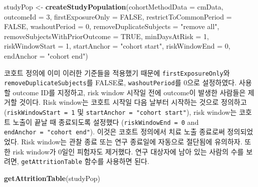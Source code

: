 \documentclass[11pt]{book}
\newenvironment{Shaded}{\begin{snugshade}}{\end{snugshade}}
\newcommand{\KeywordTok}[1]{\textcolor[rgb]{0.13,0.29,0.53}{\textbf{#1}}}
\newcommand{\DataTypeTok}[1]{\textcolor[rgb]{0.13,0.29,0.53}{#1}}
\newcommand{\DecValTok}[1]{\textcolor[rgb]{0.00,0.00,0.81}{#1}}
\newcommand{\StringTok}[1]{\textcolor[rgb]{0.31,0.60,0.02}{#1}}
\newcommand{\OtherTok}[1]{\textcolor[rgb]{0.56,0.35,0.01}{#1}}
\newcommand{\NormalTok}[1]{#1}
\theoremstyle{definition}
\theoremstyle{definition}
\theoremstyle{definition}
\theoremstyle{remark}
\begin{document}
\begin{Shaded}
\begin{Highlighting}[]
\NormalTok{studyPop <-}\StringTok{ }\KeywordTok{createStudyPopulation}\NormalTok{(}\DataTypeTok{cohortMethodData =}\NormalTok{ cmData,}
                                  \DataTypeTok{outcomeId =} \DecValTok{3}\NormalTok{,}
                                  \DataTypeTok{firstExposureOnly =} \OtherTok{FALSE}\NormalTok{,}
                                  \DataTypeTok{restrictToCommonPeriod =} \OtherTok{FALSE}\NormalTok{,}
                                  \DataTypeTok{washoutPeriod =} \DecValTok{0}\NormalTok{,}
                                  \DataTypeTok{removeDuplicateSubjects =} \StringTok{"remove all"}\NormalTok{,}
                                  \DataTypeTok{removeSubjectsWithPriorOutcome =} \OtherTok{TRUE}\NormalTok{,}
                                  \DataTypeTok{minDaysAtRisk =} \DecValTok{1}\NormalTok{,}
                                  \DataTypeTok{riskWindowStart =} \DecValTok{1}\NormalTok{,}
                                  \DataTypeTok{startAnchor =} \StringTok{"cohort start"}\NormalTok{,}
                                  \DataTypeTok{riskWindowEnd =} \DecValTok{0}\NormalTok{,}
                                  \DataTypeTok{endAnchor =} \StringTok{"cohort end"}\NormalTok{)}
\end{Highlighting}
\end{Shaded}

코호트 정의에 이미 이러한 기준들을 적용했기 때문에
\texttt{firstExposureOnly}와 \texttt{removeDuplicateSubjects}를 FALSE로,
\texttt{washoutPeriod}를 0으로 설정하였다. 사용할 outcome ID를 지정하고,
risk window 시작일 전에 outcome이 발생한 사람들은 제거할 것이다. Risk
window는 코호트 시작일 다음 날부터 시작하는 것으로 정의하고
(\texttt{riskWindowStart\ =\ 1} 및
\texttt{startAnchor\ =\ "cohort\ start"}), risk window는 코호트 노출이
끝날 때 종료되도록 설정했다 (\texttt{riskWindowEnd\ =\ 0} and
\texttt{endAnchor\ =\ "cohort\ end"}). 이것은 코호트 정의에서 치료 노출
종료로써 정의되었었다. Risk window는 관찰 종료 또는 연구 종료일에
자동으로 절단됨에 유의하자. 또한 risk window가 0일인 피험자도 제거했다.
연구 대상자에 남아 있는 사람의 수를 보려면, \texttt{getAttritionTable}
함수를 사용하면 된다.

\begin{Shaded}
\begin{Highlighting}[]
\KeywordTok{getAttritionTable}\NormalTok{(studyPop)}
\end{Highlighting}
\end{Shaded}
\end{document}
